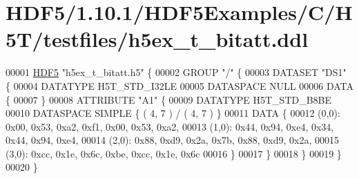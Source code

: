 \hypertarget{_h_d_f5_21_810_81_2_h_d_f5_examples_2_c_2_h5_t_2testfiles_2h5ex__t__bitatt_8ddl_source}{}\section{H\+D\+F5/1.10.1/\+H\+D\+F5\+Examples/\+C/\+H5\+T/testfiles/h5ex\+\_\+t\+\_\+bitatt.ddl}
\label{_h_d_f5_21_810_81_2_h_d_f5_examples_2_c_2_h5_t_2testfiles_2h5ex__t__bitatt_8ddl_source}

\begin{DoxyCode}
00001 \hyperlink{namespace_h_d_f5}{HDF5} \textcolor{stringliteral}{"h5ex\_t\_bitatt.h5"} \{
00002 GROUP \textcolor{stringliteral}{"/"} \{
00003    DATASET \textcolor{stringliteral}{"DS1"} \{
00004       DATATYPE  H5T\_STD\_I32LE
00005       DATASPACE  NULL
00006       DATA \{
00007       \}
00008       ATTRIBUTE \textcolor{stringliteral}{"A1"} \{
00009          DATATYPE  H5T\_STD\_B8BE
00010          DATASPACE  SIMPLE \{ ( 4, 7 ) / ( 4, 7 ) \}
00011          DATA \{
00012          (0,0): 0x00, 0x53, 0xa2, 0xf1, 0x00, 0x53, 0xa2,
00013          (1,0): 0x44, 0x94, 0xe4, 0x34, 0x44, 0x94, 0xe4,
00014          (2,0): 0x88, 0xd9, 0x2a, 0x7b, 0x88, 0xd9, 0x2a,
00015          (3,0): 0xcc, 0x1e, 0x6c, 0xbe, 0xcc, 0x1e, 0x6c
00016          \}
00017       \}
00018    \}
00019 \}
00020 \}
\end{DoxyCode}
